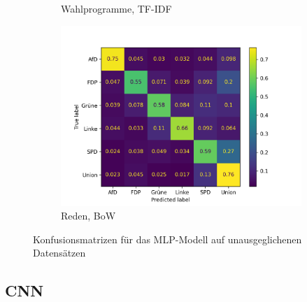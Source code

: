 \begin{figure}[H]
\begin{subfigure}{0.49\textwidth}
        \caption{Wahlprogramme, \ac{TF-IDF}}
        \label{sfig:confusionMatrixMlpManifestUnbalanced}
    \end{subfigure}
    \hfill
    \begin{subfigure}{0.49\textwidth}
        \includegraphics[width=\textwidth]{data/images/modeling/mlp/none/speeches_confusion_matrix.png}
        \caption{Reden, \ac{BoW}}
        \label{sfig:confusionMatrixMlpSpeechesUnbalanced}
    \end{subfigure}
    \caption{Konfusionsmatrizen für das \acs{MLP}-Modell auf unausgeglichenen Datensätzen} \label{fig:confusionMatrixMlpUnbalanced}
\end{figure}

\subsection*{CNN}

